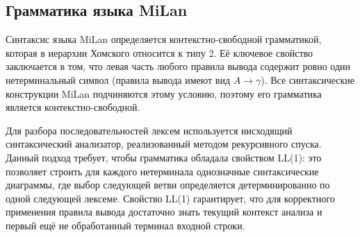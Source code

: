 \documentclass[a4paper,final]{article}
\begin{document}
\subsection{Грамматика языка MiLan}
Синтаксис языка MiLan определяется контекстно-свободной грамматикой, которая в иерархии Хомского относится к типу 2. Её ключевое свойство заключается в том, что левая часть любого правила вывода содержит ровно один нетерминальный символ (правила вывода имеют вид $A \to \gamma$). Все синтаксические конструкции MiLan подчиняются этому условию, поэтому его грамматика является контекстно-свободной.

Для разбора последовательностей лексем используется нисходящий синтаксический анализатор, реализованный методом рекурсивного спуска. Данный подход требует, чтобы грамматика обладала свойством LL(1): это позволяет строить для каждого нетерминала однозначные синтаксические диаграммы, где выбор следующей ветви определяется детерминированно по одной следующей лексеме. Свойство LL(1) гарантирует, что для корректного применения правила вывода достаточно знать текущий контекст анализа и первый ещё не обработанный терминал входной строки.
\end{document}
